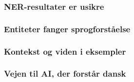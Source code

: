 \documentclass{beamer}
\begin{document}
\begin{frame}
    \frametitle{NER-resultater er usikre}
    
\end{frame}

\begin{frame}
    \frametitle{Entiteter fanger sprogforståelse}
\end{frame}

\begin{frame}
    \frametitle{Kontekst og viden i eksempler}
\end{frame}

\begin{frame}
    \frametitle{Vejen til AI, der forstår dansk}
\end{frame}
\end{document}
